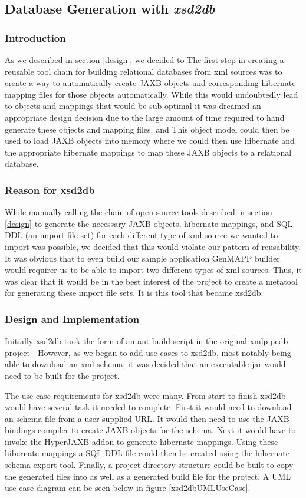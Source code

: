 \subsection{Database Generation with \emph{xsd2db}}
\label{xsd2db}
\subsubsection{Introduction}
As we described in section \ref{design}, we decided to 
The first step in creating a reusable tool chain for building relational databases from xml sources was to create a way to automatically create JAXB objects and corresponding hibernate mapping files for those objects automatically.  While this would undoubtedly lead to objects and mappings that would be sub optimal it was dreamed an appropriate design decision due to the large amount of time required to hand generate these objects and mapping files.  and   This object model could then be used to load JAXB objects into memory where we could then use hibernate and the appropriate hibernate mappings to map these JAXB objects to a relational database. 

\subsubsection{Reason for xsd2db}
While manually calling the chain of open source tools described in section \ref{design} to generate the necessary JAXB objects, hibernate mappings, and SQL DDL (an import file set) for each different type of xml source we wanted to import was possible, we decided that this would violate our pattern of reusability.  It was obvious that to even build our sample application GenMAPP builder would requirer us to be able to import two different types of xml sources.   Thus, it was clear that it would be in the best interest of the project to create a metatool for generating these import file sets.  It is this tool that became xsd2db.    
\subsubsection{Design and Implementation}
Initially xsd2db took the form of an ant build script in the original xmlpipedb project \cite{xmlpipedb}.  However, as we began to add use cases to xsd2db, most notably being able to download an xml schema,  it was decided that an executable jar would need to be built for the project.

The use case requirements for xsd2db were many.  From start to finish xsd2db would have several task it needed to complete.  First it would need to download an schema file from a user supplied URL.  It would then need to use the JAXB bindings compiler to create JAXB objects for the schema.  Next it would have to invoke the HyperJAXB addon to generate hibernate mappings.  Using these hibernate mappings a SQL DDL file could then be created using the hibernate schema export tool.  Finally, a project directory structure could be built to copy the generated files into as well as a generated build file for the project.  A UML use case diagram can be seen below in figure \ref{xsd2dbUMLUseCase}.

